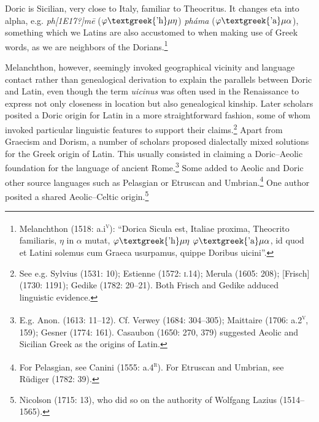 \begin{styleQuote}
Doric is Sicilian, very close to Italy, familiar to Theocritus. It changes eta into alpha, e.g. \textit{ph[1E17?]m\=e }($\varphi \text{\textgreek{'h}}\mu \eta $) \textit{pháma} ($\varphi \text{\textgreek{'a}}\mu \alpha $), something which we Latins are also accustomed to when making use of Greek words, as we are neighbors of the Dorians.\footnote{ Melanchthon (1518: a.i\textsc{\textsuperscript{v}}): “Dorica Sicula est, Italiae proxima, Theocrito familiaris, $\eta $ in $\alpha $ mutat, $\varphi \text{\textgreek{'h}}\mu \eta $ $\varphi \text{\textgreek{'a}}\mu \alpha $, id quod et Latini solemus cum Graeca usurpamus, quippe Doribus uicini”.}
\end{styleQuote}

\begin{styleStandard}
Melanchthon, however, seemingly invoked geographical vicinity and language contact rather than genealogical derivation to explain the parallels between Doric and Latin, even though the term \textit{uicinus} was often used in the Renaissance to express not only closeness in location but also genealogical kinship. Later scholars posited a Doric origin for Latin in a more straightforward fashion, some of whom invoked particular linguistic features to support their claims.\footnote{ See e.g. Sylvius (1531: 10); Estienne (1572: \textsc{i.}14); Merula (1605: 208); [Frisch] (1730: 1191); Gedike (1782: 20–21). Both Frisch and Gedike adduced linguistic evidence.} Apart from Graecism and Dorism, a number of scholars proposed dialectally mixed solutions for the Greek origin of Latin. This usually consisted in claiming a Doric–Aeolic foundation for the language of ancient Rome.\footnote{ E.g. Anon. (1613: 11–12). Cf. Verwey (1684: 304–305); Maittaire (1706: a.2\textsc{\textsuperscript{v}}, 159); Gesner (1774: 161). Casaubon (1650: 270, 379) suggested Aeolic and Sicilian Greek as the origins of Latin.} Some added to Aeolic and Doric other source languages such as Pelasgian or Etruscan and Umbrian.\footnote{ For Pelasgian, see Canini (1555: a.4\textsc{\textsuperscript{r}}). For Etruscan and Umbrian, see Rüdiger (1782: 39).} One author posited a shared Aeolic–Celtic origin.\footnote{ Nicolson (1715: 13), who did so on the authority of Wolfgang Lazius (1514–1565).}
\end{styleStandard}

